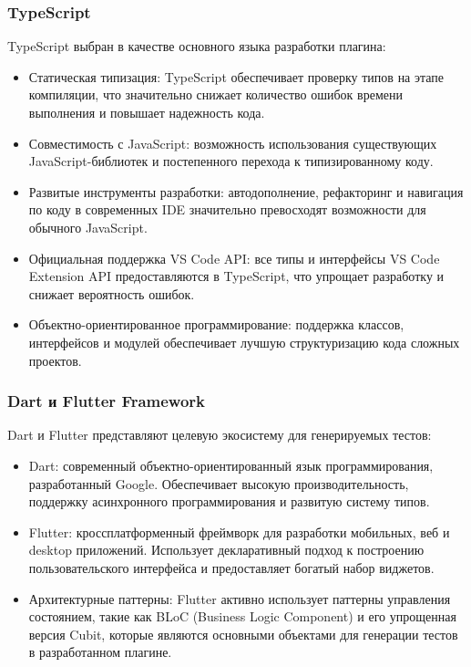 \documentclass[14pt, russian]{scrartcl}
\begin{document}
\subsubsection{TypeScript}

TypeScript выбран в качестве основного языка разработки плагина:
\begin{itemize}
    \item Статическая типизация: TypeScript обеспечивает проверку типов на этапе компиляции, что значительно снижает количество ошибок времени выполнения и повышает надежность кода.
    \item Совместимость с JavaScript: возможность использования существующих JavaScript-библиотек и постепенного перехода к типизированному коду.
    \item Развитые инструменты разработки: автодополнение, рефакторинг и навигация по коду в современных IDE значительно превосходят возможности для обычного JavaScript.
    \item Официальная поддержка VS Code API: все типы и интерфейсы VS Code Extension API предоставляются в TypeScript, что упрощает разработку и снижает вероятность ошибок.
    \item Объектно-ориентированное программирование: поддержка классов, интерфейсов и модулей обеспечивает лучшую структуризацию кода сложных проектов.
\end{itemize}

\subsubsection{Dart и Flutter Framework}

Dart и Flutter представляют целевую экосистему для генерируемых тестов:
\begin{itemize}
    \item Dart: современный объектно-ориентированный язык программирования, разработанный Google. Обеспечивает высокую производительность, поддержку асинхронного программирования и развитую систему типов.
    \item Flutter: кроссплатформенный фреймворк для разработки мобильных, веб и desktop приложений. Использует декларативный подход к построению пользовательского интерфейса и предоставляет богатый набор виджетов.
    \item Архитектурные паттерны: Flutter активно использует паттерны управления состоянием, такие как BLoC (Business Logic Component) и его упрощенная версия Cubit, которые являются основными объектами для генерации тестов в разработанном плагине.
\end{itemize}
\end{document}
